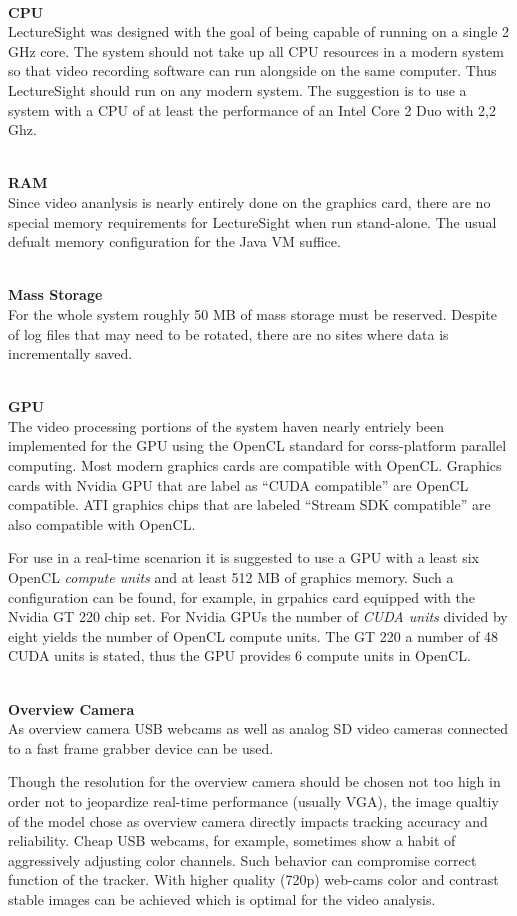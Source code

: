 \documentclass[a4paper,10pt]{book}
\begin{document}
~\\\noindent\textbf{CPU}\\
\noindent LectureSight was designed with the goal of being capable of running on a single 2 GHz core. The system should not take up all CPU resources in a modern system so that video recording software can run alongside on the same computer. Thus LectureSight should run on any modern system. The suggestion is to use a system with a CPU of at least the performance of an Intel Core 2 Duo with 2,2 Ghz.

~\\\noindent\textbf{RAM}\\
\noindent Since video ananlysis is nearly entirely done on the graphics card, there are no special memory requirements for LectureSight when run stand-alone. The usual defualt memory configuration for the Java VM suffice.  

~\\\noindent\textbf{Mass Storage}\\
\noindent For the whole system roughly 50 MB of mass storage must be reserved. Despite of log files that may need to be rotated, there are no sites where data is incrementally saved.

~\\\noindent\textbf{GPU}\\
The video processing portions of the system haven nearly entriely been implemented for the GPU using the OpenCL standard for corss-platform parallel computing. Most modern graphics cards are compatible with OpenCL. Graphics cards with Nvidia GPU that are label as ``CUDA compatible'' are OpenCL compatible. ATI graphics chips that are labeled ``Stream SDK compatible'' are also compatible with OpenCL.

For use in a real-time scenarion it is suggested to use a GPU with a least six OpenCL \textit{compute units} and at least 512 MB of graphics memory. Such a configuration can be found, for example, in grpahics card equipped with the Nvidia GT 220 chip set. For Nvidia GPUs the number of \textit{CUDA units} divided by eight yields the number of OpenCL compute units. The GT 220 a number of 48 CUDA units is stated, thus the GPU provides 6 compute units in OpenCL.

~\\\noindent\textbf{Overview Camera}\\
As overview camera USB webcams as well as analog SD video cameras connected to a fast frame grabber device can be used. 

Though the resolution for the overview camera should be chosen not too high in order not to jeopardize real-time performance (usually VGA), the image qualtiy of the model chose as overview camera directly impacts tracking accuracy and reliability. Cheap USB webcams, for example, sometimes show a habit of aggressively adjusting color channels. Such behavior can compromise correct function of the tracker. With higher quality (720p) web-cams color and contrast stable images can be achieved which is optimal for the video analysis. 
\end{document}
